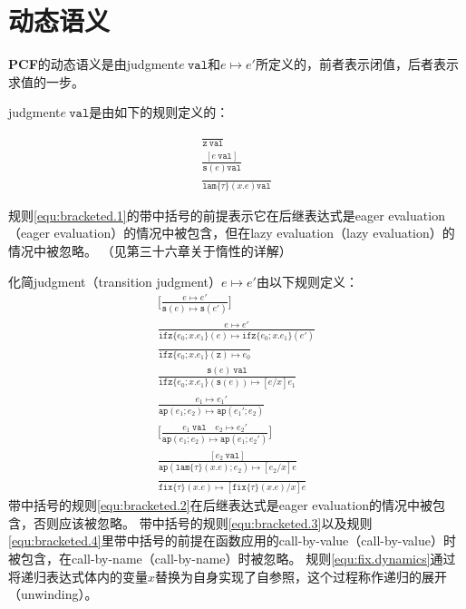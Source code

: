 \section{动态语义}

\textbf{PCF}的动态语义是由\gls{judgment}\(e\ \mathtt{val}\)和\(e \longmapsto e'\)所定义的，前者表示闭值，后者表示求值的一步。

\gls{judgment}\(e\ \mathtt{val}\)是由如下的规则定义的：

\begin{gather}
	\frac{}{
		\mathtt{z}\ \mathtt{val}
	}
	\tag{19.2a} \\
	\frac{
		[e\ \mathtt{val}]
	}{
		\mathtt{s}(e) \mathtt{val}
	}
	\tag{19.2b} 
	\label{equ:bracketed.1} \\
	\frac{}{
		\mathtt{lam}\{\tau\}(x.e) \mathtt{val}
	}
	\tag{19.2c}
\end{gather}

规则\ref{equ:bracketed.1}的带中括号的前提表示它在后继表达式是\gls{eager evaluation}（eager evaluation）的情况中被包含，但在\gls{lazy evaluation}（lazy evaluation）的情况中被忽略。
（见第三十六章关于惰性的详解）

化简\gls{judgment}（transition judgment）\(e \longmapsto e'\)由以下规则定义：
\begin{gather}
	\bigg[
	\frac{
		e \longmapsto e'
	}{
		\mathtt{s}(e) \longmapsto \mathtt{s}(e')
	}
	\bigg]
	\tag{19.3a}
	\label{equ:bracketed.2} \\
	\frac{
		e \longmapsto e'
	}{
		\mathtt{ifz}\{e_0;x.e_1\}(e) \longmapsto \mathtt{ifz}\{e_0;x.e_1\}(e')
	}
	\tag{19.3b} \\
	\frac{}{
		\mathtt{ifz}\{e_0;x.e_1\}(\mathtt{z}) \longmapsto e_0
	}
	\tag{19.3c} \\
	\frac{
		\mathtt{s}(e)\ \mathtt{val}
	}{
		\mathtt{ifz}\{e_0;x.e_1\}(\mathtt{s}(e)) \longmapsto [e/x]e_1
	}
	\tag{19.3d} \\
	\frac{
		e_1 \longmapsto e_1'
	}{
		\mathtt{ap}(e_1;e_2) \longmapsto \mathtt{ap}(e_1';e_2)
	}
	\tag{19.3e} \\
	\bigg[
	\frac{
		e_1\ \mathtt{val} \quad e_2 \longmapsto e_2'
	}{
		\mathtt{ap}(e_1;e_2) \longmapsto \mathtt{ap}(e_1;e_2')
	}
	\bigg]
	\tag{19.3f} 
	\label{equ:bracketed.3} \\
	\frac{
		[e_2\ \mathtt{val}]
	}{
		\mathtt{ap}(\mathtt{lam}\{\tau\}(x.e);e_2) \longmapsto [e_2/x]e
	}
	\tag{19.3g} 
	\label{equ:bracketed.4} \\
	\frac{}{
		\mathtt{fix}\{\tau\}(x.e) \longmapsto [\mathtt{fix}\{\tau\}(x.e)/x]e
	}
	\tag{19.3h}
	\label{equ:fix.dynamics}
\end{gather}
带中括号的规则\ref{equ:bracketed.2}在后继表达式是\gls{eager evaluation}的情况中被包含，否则应该被忽略。
带中括号的规则\ref{equ:bracketed.3}以及规则\ref{equ:bracketed.4}里带中括号的前提在函数应用的\gls{call-by-value}（call-by-value）时被包含，在\gls{call-by-name}（call-by-name）时被忽略。
规则\ref{equ:fix.dynamics}通过将递归表达式体内的变量\(x\)替换为自身实现了自参照，这个过程称作递归的展开（unwinding）。

